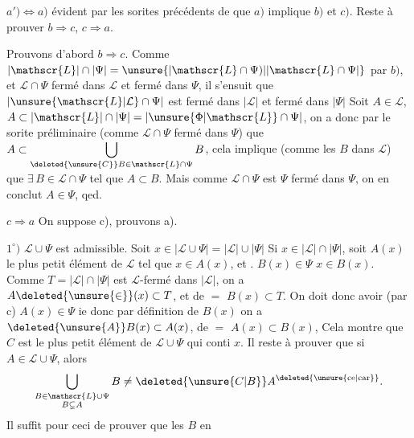$a')\Leftrightarrow a)$ évident par les sorites précédents de  que $a)$ implique $b)$ et $c)$. Reste à prouver $b\Rightarrow c$, $c\Rightarrow a$.

Prouvons d'abord $b\Rightarrow c$. Comme $|\mathscr{L}|\cap|\Psi|=\unsure{\lvert\mathscr{L}\cap\Psi)|\lvert\mathscr{L}\cap\Psi\rvert}$ par $b)$, et $\mathscr{L}\cap\Psi$ fermé dans $\mathscr{L}$ et
fermé dans $\Psi$, il s'ensuit que $\lvert\unsure{\mathscr{L}|\mathcal{L}}\cap\Psi\rvert$ est fermé dans $\lvert\mathscr{L}\rvert$ et fermé dans $\lvert\Psi\rvert$ Soit $A\in\mathscr{L}$, $A\subset\lvert\mathscr{L}\rvert\cap\lvert\Psi\rvert=\lvert\unsure{\Phi|\mathscr{L}}\cap\Psi\rvert$, on a donc par le sorite préliminaire (comme $\mathscr{L}\cap\Psi$ fermé dans $\Psi$) que $A\subset\displaystyle\bigcup_{\deleted{\unsure{C}}B\in\mathscr{L}\cap\Psi}B$, cela implique  (comme les $B$ dans $\mathscr{L}$) que $\exists\,B\in\mathscr{L}\cap\Psi$ tel que $A\subset B$.
 Mais comme $\mathscr{L}\cap\Psi$ est $\Psi$ fermé dans $\Psi$, on en conclut $A\in\Psi$, qed.

$c\Longrightarrow a$ \quad On suppose c), prouvons a).

$1^\circ)$ $\mathscr{L}\cup\Psi$ est admissible. Soit $x\in\lvert\mathscr{L}\cup\Psi\rvert=\lvert\mathscr{L}\rvert\cup\lvert\Psi\rvert$  Si $x\in\lvert\mathscr{L}\rvert\cap\lvert\Psi\rvert$, soit $A(x)$ le plus petit élément de $\mathscr{L}$ tel que $x\in A(x)$, et . $B(x)\in\Psi$  $x\in B(x)$. Comme $T=\lvert\mathscr{L}\rvert\cap\lvert\Psi\rvert$ est $\mathscr{L}$-fermé dans $\lvert\mathscr{L}\rvert$, on a $A\deleted{\unsure{\in}}(x)\subset T$, et de $=$ $B(x)\subset T$. On doit donc avoir (par c) $A(x)\in\Psi$ ie  donc par définition de $B(x)$ on a $\deleted{\unsure{A}}B(x)\subset A(x)$, de $=$ $A(x)\subset B(x)$, 
  Cela montre que $C$ est le plus petit élément de $\mathscr{L}\cup\Psi$ qui conti $x$. Il reste à prouver que si $A\in\mathscr{L}\cup\Psi$, alors  \[
 \bigcup_{\substack{B\in\mathscr{L}\cup\Psi\\B\subsetneq A}}B
 \ne\deleted{\unsure{C|B}}A^{\text{\deleted{\unsure{ce|car}}}} .
\]  Il  suffit pour ceci de prouver que  les $B$ en
